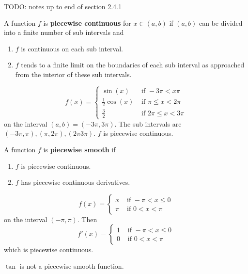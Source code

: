 TODO: notes up to end of section 2.4.1

\begin{definition}
	A function $f$ is \textbf{piecewise continuous} for $x \in (a, b)$ if $(a, b)$ can be divided into a finite number of sub intervals and
	\begin{enumerate}
		\item $f$ is continuous on each sub interval.
		\item $f$ tends to a finite limit on the boundaries of each sub interval as approached from the interior of these sub intervals.
	\end{enumerate}
\end{definition}

\begin{example}
	\[
		f(x) = \begin{cases}
			\sin(x) & \text{ if } -3 \pi < x \pi \\
			\frac{1}{2} \cos(x) & \text{ if } \pi \le x < 2 \pi \\
			\frac{3}{2} & \text { if } 2 \pi \le x < 3 \pi
		\end{cases}
	\]
	on the interval $(a, b) = (-3 \pi, 3 \pi)$. The sub intervals are $(-3 \pi, \pi), (\pi, 2 \pi), (2 \pi 3 \pi)$. $f$ is piecewise continuous.
\end{example}

\begin{definition}
	A function $f$ is \textbf{piecewise smooth} if
	\begin{enumerate}
		\item $f$ is piecewise continuous.
		\item $f$ has piecewise continuous derivatives.
	\end{enumerate}
\end{definition}

\begin{example}
	\[
		f(x) = \begin{cases}
			x & \text{ if } -\pi < x \le 0 \\
			\pi & \text{ if } 0 < x < \pi
		\end{cases}
	\]
	on the interval $(-\pi, \pi)$. Then
	\[
		f'(x) = \begin{cases}
			1 & \text{ if } -\pi < x \le 0 \\
			0 & \text{ if } 0 < x < \pi
		\end{cases}
	\]
	which is piecewise continuous.
\end{example}

\begin{example}
	$\tan$ is not a piecewise smooth function.
\end{example}

